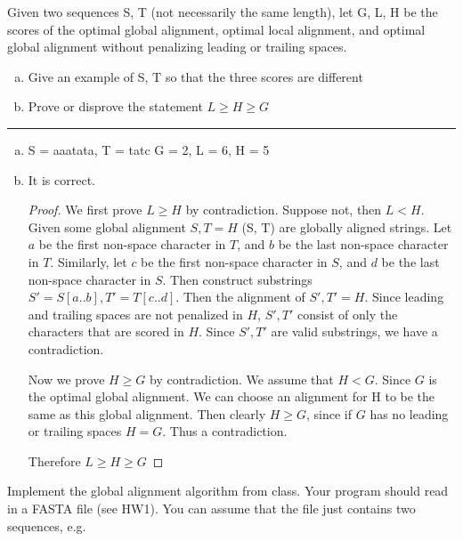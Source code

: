 \documentclass[11pt]{article}
\begin{document}
Given two sequences S, T (not necessarily the same length), let G, L, H be the scores of the
optimal global alignment, optimal local alignment, and optimal global alignment without penalizing leading or trailing spaces.


\begin{enumerate}[a)]
    \item Give an example of S, T so that the three scores are different
    \item Prove or disprove the statement $L \geq H \geq G$
\end{enumerate}

\hrule

\begin{enumerate}[a)]
    \item S = aaatata, T = tatc
    G = 2, L = 6, H = 5

    \item It is correct.
    \begin{proof}
        We first prove $L \geq H$ by contradiction.
        Suppose not, then $L < H$. 
        Given some global alignment $S, T = H$ (S, T) are globally aligned strings. 
        Let $a$ be the first non-space character in $T$, and $b$ be the last non-space character in $T$.
        Similarly, let $c$ be the first non-space character in $S$, and $d$ be the last non-space character in $S$.
        Then construct substrings $S' = S[a .. b], T' = T[c .. d]$.
        Then the alignment of $S', T' = H$. Since leading and trailing spaces
        are not penalized in $H$, $S', T'$  consist of only the characters that are scored in $H$.
        Since $S', T'$ are valid substrings, we have a contradiction. 

        Now we prove $H \geq G$ by contradiction.
        We assume that $H < G$. Since $G$ is the optimal global alignment.
        We can choose an alignment for H to be the same as this global alignment. 
        Then clearly $H \geq G$, since if $G$ has no leading or trailing spaces $H = G$.
        Thus a contradiction.

        Therefore $L \geq H \geq G$
    \end{proof}

\end{enumerate}



Implement the global alignment algorithm from class.  Your program should read in a FASTA file (see HW1).  You can assume that the file just contains two sequences, e.g.
\end{document}

